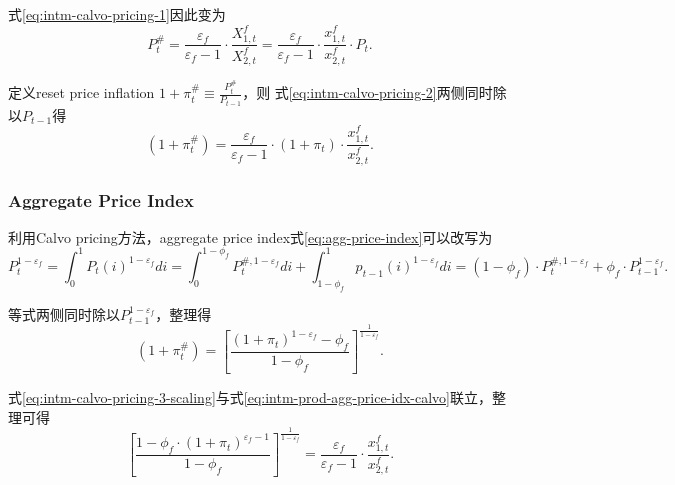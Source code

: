 式\eqref{eq:intm-calvo-pricing-1}因此变为
\begin{equation}
  \label{eq:intm-calvo-pricing-2}
  P_t^{\#} = \frac{\varepsilon_f}{\varepsilon_f - 1} \cdot \frac{X_{1,t}^f}{X_{2,t}^f} = \frac{\varepsilon_f}{\varepsilon_f - 1} \cdot \frac{x_{1,t}^f}{x_{2,t}^f} \cdot P_t.
\end{equation}

定义reset price inflation $1+\pi_t^{\#} \equiv \frac{P_t^{\#}}{P_{t-1}}$，则  式\eqref{eq:intm-calvo-pricing-2}两侧同时除以$P_{t-1}$得
  \begin{equation}
    \label{eq:intm-calvo-pricing-3-scaling}
    (1+\pi_t^{\#}) = \frac{\varepsilon_f}{\varepsilon_f -1} \cdot (1 + \pi_{t}) \cdot \frac{x_{1,t}^f}{x_{2,t}^f}.
  \end{equation}


\subsubsection{Aggregate Price Index}
\label{intm-aggregate-price-index}

利用Calvo pricing方法\citep{Calvo:1983uq}，aggregate price index式\eqref{eq:agg-price-index}可以改写为
\begin{equation*}
  P_t^{1-\varepsilon_f} = \int_{0}^1 P_t(i)^{1-\varepsilon_f} di = \int_{0}^{1-\phi_f} P_t^{\#,1-\varepsilon_f} di + \int_{1-\phi_f}^{1}p_{t-1}(i)^{1-\varepsilon_f} di = (1-\phi_f) \cdot P_t^{\#,1-\varepsilon_f}  + \phi_f \cdot P_{t-1}^{1-\varepsilon_f}.
\end{equation*}

等式两侧同时除以$P_{t-1}^{1-\varepsilon_f}$，整理得
\begin{equation}
  \label{eq:intm-prod-agg-price-idx-calvo}
  (1+\pi_t^{\#}) = \left[\frac
{
  (1+\pi_t)^{1-\varepsilon_f} - \phi_f
}
{
  1-\phi_f
}\right]^{\frac{1}{1-\varepsilon_f}}.
\end{equation}

式\eqref{eq:intm-calvo-pricing-3-scaling}与式\eqref{eq:intm-prod-agg-price-idx-calvo}联立，整理可得
\begin{equation}
    \label{eq:intm-prod-agg-price-idx-calvo-aux}
    \left[
      \frac{
        1-\phi_f \cdot (1+\pi_t)^{\varepsilon_f -1}
      }{
        1-\phi_f
      }
    \right]^{\frac{1}{1-\varepsilon_f}} = \frac{\varepsilon_f}{\varepsilon_f -1} \cdot \frac{x_{1,t}^f}{x_{2,t}^f}.
\end{equation}

